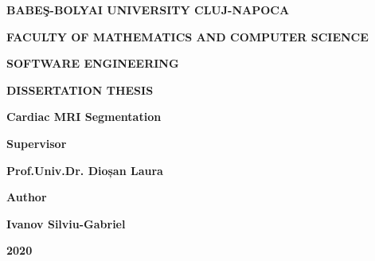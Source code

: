 \begin{titlepage}

    \rmfamily
    
    \begin{center}
    
    \textbf{\large{BABEŞ-BOLYAI UNIVERSITY CLUJ-NAPOCA}}
   
    \vspace{0.5cm}
   
    \textbf{\large{FACULTY OF MATHEMATICS AND COMPUTER SCIENCE}}
    
    \vspace{0.5cm}
   
    \textbf{\large{SOFTWARE ENGINEERING}}
        
    \vspace{4cm}

    \textbf{\Large{DISSERTATION THESIS}}
    
    \vspace{0.5cm}
      
    \textbf{\Large{Cardiac MRI Segmentation}}
    \end{center}
    
    \vspace{4cm}
     
    \begin{flushleft}
    \textbf{\Large{Supervisor}}
    
    \vspace{0.5cm}
    
    \textbf{\Large{Prof.Univ.Dr. Dioșan Laura}}
    \end{flushleft}
    
     \vspace{2cm}
     
    \begin{flushright}
    
    \textbf{\Large{Author}}
    
    \vspace{0.5cm}
    
    \textbf{\Large{Ivanov Silviu-Gabriel}}
    
    \end{flushright}
    
    \vfill
    
    \begin{center}
    
    \textbf{\Large{2020}}
    
    \end{center}
    
\end{titlepage}